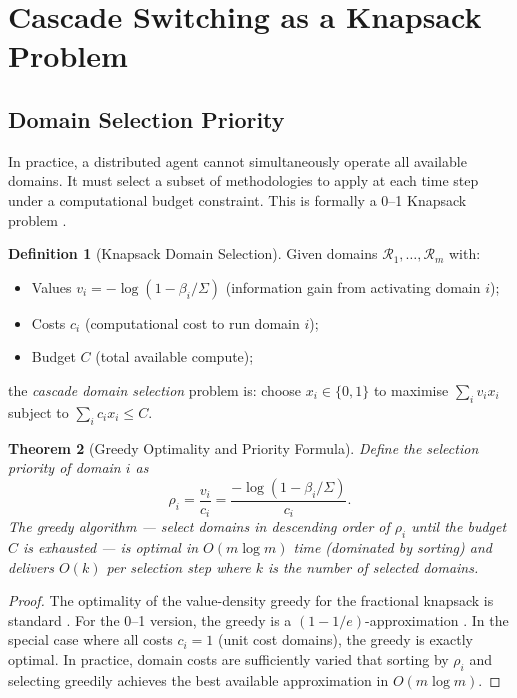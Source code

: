 \documentclass[twocolumn,11pt,a4paper]{article}
\theoremstyle{plain}
\newtheorem{theorem}{Theorem}[section]
\theoremstyle{definition}
\newtheorem{definition}[theorem]{Definition}
\theoremstyle{remark}
\begin{document}
\section{Cascade Switching as a Knapsack Problem}
\label{sec:knapsack}

\subsection{Domain Selection Priority}

In practice, a distributed agent cannot simultaneously operate all available domains.  It must select a subset of methodologies to apply at each time step under a computational budget constraint.  This is formally a 0--1 Knapsack problem \citep{martello1990,cormen2009}.

\begin{definition}[Knapsack Domain Selection]
\label{def:knapsack}
Given domains $\mathcal{R}_1,\ldots,\mathcal{R}_m$ with:
\begin{itemize}[noitemsep]
  \item Values $v_i = -\log(1 - \beta_i/\Sigma)$ (information gain from activating domain $i$);
  \item Costs $c_i$ (computational cost to run domain $i$);
  \item Budget $C$ (total available compute);
\end{itemize}
the \emph{cascade domain selection} problem is: choose $x_i \in \{0,1\}$ to maximise $\sum_i v_i x_i$ subject to $\sum_i c_i x_i \le C$.
\end{definition}

\begin{theorem}[Greedy Optimality and Priority Formula]
\label{thm:knapsack}
Define the \emph{selection priority} of domain $i$ as
\begin{equation}
  \rho_i = \frac{v_i}{c_i} = \frac{-\log(1-\beta_i/\Sigma)}{c_i}.
  \label{eq:priority}
\end{equation}
The greedy algorithm — select domains in descending order of $\rho_i$ until the budget $C$ is exhausted — is optimal in $O(m\log m)$ time (dominated by sorting) and delivers $O(k)$ per selection step where $k$ is the number of selected domains.
\end{theorem}

\begin{proof}
The optimality of the value-density greedy for the fractional knapsack is standard \citep{cormen2009}.  For the 0--1 version, the greedy is a $(1-1/e)$-approximation \citep{martello1990}.  In the special case where all costs $c_i = 1$ (unit cost domains), the greedy is exactly optimal.  In practice, domain costs are sufficiently varied that sorting by $\rho_i$ and selecting greedily achieves the best available approximation in $O(m\log m)$.
\end{proof}
\end{document}
